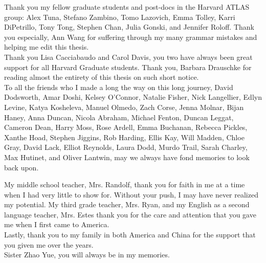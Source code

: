 \indent Thank you my fellow graduate students and post-docs in the Harvard ATLAS group: Alex Tuna, Stefano Zambino, Tomo Lazovich, Emma Tolley, Karri DiPetrillo, Tony Tong, Stephen Chan, Julia Gonski, and Jennifer Roloff.  Thank you especially, Ann Wang for suffering through my many grammar mistakes and helping me edit this thesis. \\

\indent Thank you Lisa Cacciabaudo and Carol Davis, you two have always been great support for all Harvard Graduate students.  Thank you, Barbara Drauschke for reading almost the entirety of this thesis on such short notice. \\

\indent To all the friends who I made a long the way on this long journey, David Dodsworth, Amar Doshi, Kelsey O'Connor, Natalie Fisher, Nick Langellier, Edlyn Levine, Katya Kosheleva, Manuel Olmedo, Zach Corse, Jenna Molnar, Bijan Haney, Anna Duncan, Nicola Abraham, Michael Fenton, Duncan Leggat, Cameron Dean, Harry Moss, Rose Ardell, Emma Buchanan, Rebecca Pickles, Xanthe Hoad, Stephen Jiggins, Rob Harding, Ellis Kay, Will Madden, Chloe Gray, David Lack, Elliot Reynolds, Laura Dodd, Murdo Trail, Sarah Charley, Max Hutinet, and Oliver Lantwin, may we always have fond memories to look back upon. 

\indent My middle school teacher, Mrs. Randolf, thank you for faith in me at a time when I had very little to show for. Without your push, I may have never realized my potential. My third grade teacher, Mrs. Ryan, and my English as a second language teacher, Mrs. Estes thank you for the care and attention that you gave me when I first came to America. ~\\

\indent Lastly, thank you to my family in both America and China for the support that you given me over the years.\\

\indent Sister Zhao Yue, you will always be in my memories. ~\\